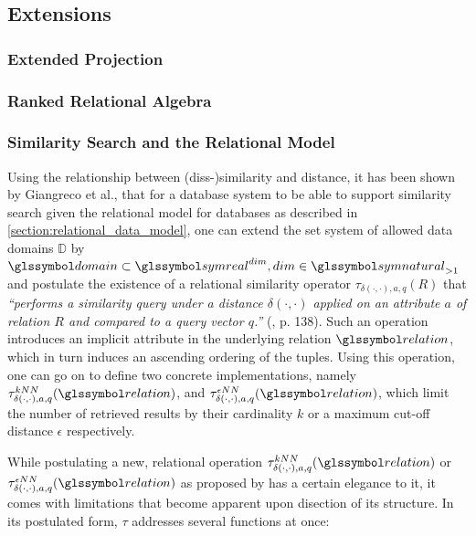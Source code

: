 \subsection{Extensions}
\label{section:rel_extensions}


\subsubsection{Extended Projection}

\subsubsection{Ranked Relational Algebra}

\subsubsection{Similarity Search and the Relational Model}

Using the relationship between (diss-)similarity and distance, it has been shown by Giangreco et al., that for a database system to be able to support similarity search given the relational model for databases as described in \cref{section:relational_data_model}, one can extend the set system of allowed data domains $\mathbb{D}$ by $\domain \subset \symreal^{dim}, dim \in \symnatural_{>1}$ and postulate the existence of a relational similarity operator $\tau_{\delta(\cdot,\cdot),a,q}(R)$ that \emph{``performs a similarity query under a distance $\delta(\cdot,\cdot)$ applied on an attribute $a$ of relation $R$ and compared to a query vector $q$.''} (\cite{Giangreco:2018thesis}, p. 138). Such an operation introduces an implicit attribute in the underlying relation $\relation$, which in turn induces an ascending ordering of the tuples. Using this operation, one can go on to define two concrete implementations, namely $\tau^{kNN}_{\delta(\cdot,\cdot),a,q}(\relation)$, and $\tau^{\epsilon NN}_{\delta(\cdot,\cdot),a,q}(\relation)$, which limit the number of retrieved results by their cardinality $k$ or a maximum cut-off distance $\epsilon$ respectively.

While postulating a new, relational operation $\tau^{kNN}_{\delta(\cdot,\cdot),a,q}(\relation)$ or $\tau^{\epsilon NN}_{\delta(\cdot,\cdot),a,q}(\relation)$ as proposed by \cite{Giangreco:2018thesis} has a certain elegance to it, it comes with limitations that become apparent upon disection of its structure. In its postulated form, $\tau$ addresses several functions at once:

